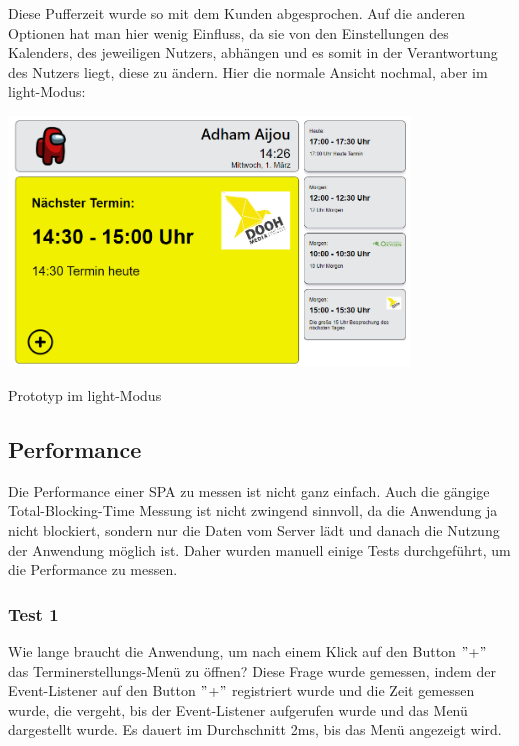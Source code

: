 Diese Pufferzeit wurde so mit dem Kunden abgesprochen.
Auf die anderen Optionen hat man hier wenig Einfluss, da sie von den Einstellungen des Kalenders, des jeweiligen Nutzers, abhängen und es somit in der Verantwortung des Nutzers liegt, diese zu ändern.
\newline
\newline
Hier die normale Ansicht nochmal, aber im light-Modus:
\par\vspace{1cm}
    \centering
    \includegraphics[width=0.8\textwidth]{Bilder/Ergebnis_lightMode}
    \caption{Prototyp im light-Modus}
    \label{fig:PrototypLight}
\par\vspace{1cm}
\raggedright
\newline
\newline
\subsection{Performance}\label{subsec:performance}
Die Performance einer SPA zu messen ist nicht ganz einfach.
Auch die gängige Total-Blocking-Time Messung ist nicht zwingend sinnvoll, da die Anwendung ja nicht blockiert, sondern nur die Daten vom Server lädt und danach die Nutzung der Anwendung möglich ist.
Daher wurden manuell einige Tests durchgeführt, um die Performance zu messen.
\newline
\newline
\subsubsection{Test 1}\label{subsubsec:test-1}
\newline
\newline
Wie lange braucht die Anwendung, um nach einem Klick auf den Button \("\)+\("\) das Terminerstellungs-Menü zu öffnen?
Diese Frage wurde gemessen, indem der Event-Listener auf den Button \("\)+\("\) registriert wurde und die Zeit gemessen wurde, die vergeht, bis der Event-Listener aufgerufen wurde und das Menü dargestellt wurde.
Es dauert im Durchschnitt 2ms, bis das Menü angezeigt wird.
\newline
\newline

